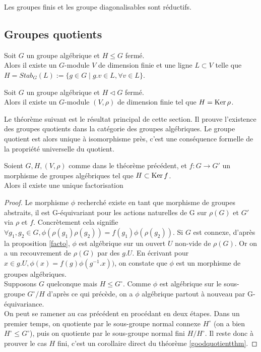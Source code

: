 \begin{ex}
Les groupes finis et les groupe diagonalisables sont réductifs.
\end{ex}

\subsection{Groupes quotients}
\begin{thm}
Soit $G$ un groupe algébrique et $H\leq G$ fermé. \\Alors il existe un $G$-module $V$ de dimension finie et une ligne $L\subset V$ telle que $H=Stab_G(L):=\lbrace g\in G\mid g.v\in L,\forall v\in L\rbrace$.
\end{thm}

\begin{thm}
Soit $G$ un groupe algébrique et $H\lhd G$ fermé. \\Alors il existe un $G$-module $(V, \rho)$ de dimension finie tel que $H=\operatorname{Ker}{\rho}$.
\end{thm}
Le théorème suivant est le résultat principal de cette section. Il prouve l'existence des groupes quotients dans la catégorie des groupes algébriques. Le groupe quotient est alors unique à isomorphisme près, c'est une conséquence formelle de la propriété universelle du quotient.
\begin{thm}[Car. 0]\label{groupequotient}
Soient $G, H, (V, \rho)$ comme dans le théorème précédent, et $f:G \rightarrow G'$ un morphisme de groupes algébriques tel que $H\subset \operatorname{Ker} f$.\\
Alors il existe une unique factorisation 	
\end{thm}
\begin{proof}
	Le morphisme $\phi$ recherché existe en tant que morphisme de groupes abstraits, il est G-équivariant pour les actions naturelles de G sur $\rho(G)$ et $G'$ via $\rho$ et $f$. Concrètement cela signifie $\forall g_1, g_2 \in G, \phi(\rho(g_1)\rho(g_2))=f(g_1)\phi(\rho(g_2))$. Si $G$ est connexe, d'après la proposition \ref{facto}, $\phi$ est algébrique sur un ouvert $U$ non-vide de $\rho(G)$. Or on a un recouvrement de $\rho(G)$ par des $g.U$. En écrivant pour $x\in g.U,  \phi(x)=f(g)\phi(g^{-1}.x))$, on constate que $\phi$ est un morphisme de groupes algébriques.
	\\Supposons $G$ quelconque mais $H\leq G^\circ$. Comme $\phi$ est algébrique sur le sous-groupe $G^\circ/H$ d'après ce qui précède, on a $\phi$ algébrique partout à nouveau par G-équivariance.\\
	On peut se ramener au cas précédent en procédant en deux étapes. Dans un premier temps, on quotiente par le sous-groupe normal connexe $H^\circ$ (on a bien $H^\circ\leq G^\circ$), puis on quotiente par le sous-groupe normal fini $H/H^\circ$. Il reste donc à prouver le cas $H$ fini, c'est un corollaire direct du théorème \ref{goodquotientthm}.
	\end{proof}
